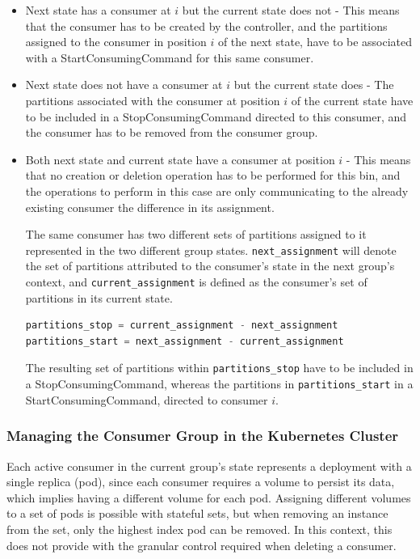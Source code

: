 \begin{itemize} 
    \item Next state has a consumer at $i$ but the current state does not - This
        means that the consumer has to be created by the controller, and the
        partitions assigned to the consumer in position $i$ of the next state,
        have to be associated with a StartConsumingCommand for this same
        consumer.  
    \item Next state does not have a consumer at $i$ but the current state
        does - The partitions associated with the consumer at position $i$ of
        the current state have to be included in a StopConsumingCommand
        directed to this consumer, and the consumer has to be removed from the
        consumer group.  
    \item Both next state and current state have a consumer at position $i$ -
        This means that no creation or deletion operation has to be performed
        for this bin, and the operations to perform in this case are only
        communicating to the already existing consumer the difference in its
        assignment. 
    
        The same consumer has two different sets of partitions assigned to it
        represented in the two different group states.
        \lstinline[language=Python]{next_assignment} will denote the set of
        partitions attributed to the consumer's state in the next group's
        context, and \lstinline[language=Python]{current_assignment} is defined
        as the consumer's set of partitions in its current state.
    
\begin{lstlisting}[language=Python] 
partitions_stop = current_assignment - next_assignment 
partitions_start = next_assignment - current_assignment
\end{lstlisting} 
        The resulting set of partitions within \lstinline{partitions_stop} have
        to be included in a StopConsumingCommand, whereas the partitions in
        \lstinline{partitions_start} in a StartConsumingCommand, directed to
        consumer $i$.
\end{itemize}

\subsubsection{Managing the Consumer Group in the Kubernetes Cluster}

Each active consumer in the current group's state represents a deployment with
a single replica (pod), since each consumer requires a volume to persist its
data, which implies having a different volume for each pod. Assigning different
volumes to a set of pods is possible with stateful sets, but when removing an
instance from the set, only the highest index pod can be removed. In this
context, this does not provide with the granular control required when deleting a
consumer. 

